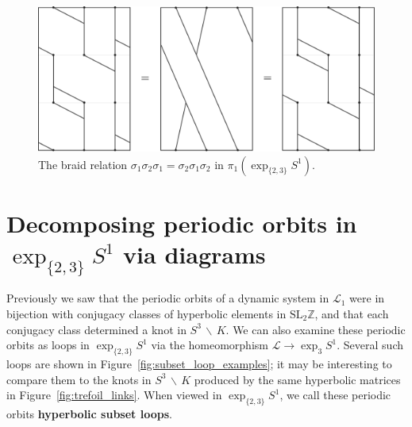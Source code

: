 \documentclass[12pt,twoside]{reedthesis}
\theoremstyle{definition}
\newcommand{\Z}{\mathbb{Z}}
\newcommand{\LS}{\mathcal{L}}
\newcommand{\SLZ}{\mathrm{SL}_2{\Z}}
\newcommand{\exptwothree}{\exp_{\{2,3\}}}
\newcommand{\wo}{\, \backslash \,}
\newcommand{\defnphrase}[1]{\textbf{#1}}
\begin{document}
\begin{figure}[h]
  \centering
  \includegraphics[width=0.8\linewidth]{figures/braid_relation_exp.pdf}
  \caption{The braid relation $\sigma_1 \sigma_2 \sigma_1 = \sigma_2 \sigma_1 \sigma_2$ in $\pi_1(\exptwothree S^1)$.}
  \label{fig:braid_relation_exp}
\end{figure}

\section{Decomposing periodic orbits in $\exptwothree S^1$ via diagrams}

Previously we saw that the periodic orbits of a dynamic system in $\LS_1$ were in bijection with conjugacy classes of hyperbolic elements in $\SLZ$, and that each conjugacy class determined a knot in $S^3 \wo K$.
We can also examine these periodic orbits as loops in $\exptwothree S^1$ via the homeomorphism $\LS \to \exp_3 S^1$.
Several such loops are shown in Figure~\ref{fig:subset_loop_examples}; it may be interesting to compare them to the knots in $S^3 \wo K$ produced by the same hyperbolic matrices in Figure~\ref{fig:trefoil_links}.
When viewed in $\exptwothree S^1$, we call these periodic orbits \defnphrase{hyperbolic subset loops}.
\end{document}

